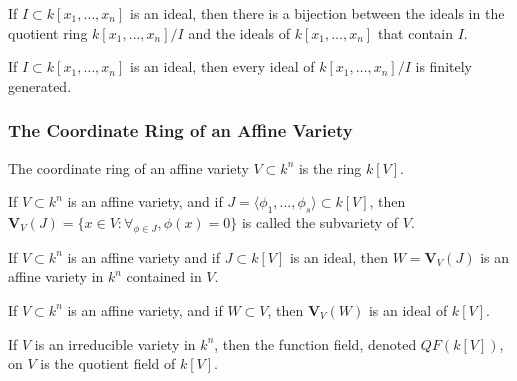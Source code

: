 \documentclass[crop=false,class=book,oneside]{standalone}
\begin{document}
                \begin{theorem}
                    If $I\subset k[x_1,\hdots ,x_n]$ is an ideal,
                    then there is a bijection between the ideals
                    in the quotient ring $k[x_1,\hdots ,x_n]/I$
                    and the ideals of $k[x_1,\hdots ,x_n]$
                    that contain $I$.
                \end{theorem}
                \begin{theorem}
                    If $I\subset k[x_1,\hdots ,x_n]$ is an ideal,
                    then every ideal of $k[x_1,\hdots ,x_n]/I$
                    is finitely generated.
                \end{theorem}
            \subsubsection{The Coordinate Ring of an Affine Variety}
                \begin{definition}
                    The coordinate ring of an affine variety
                    $V\subset k^n$ is the ring $k[V]$.
                \end{definition}
                \begin{definition}
                    If $V\subset k^n$ is an affine variety, and if
                    $J=\langle\phi_1,\hdots,\phi_s\rangle\subset k[V]$,
                    then
                    $\mathbf{V}_{V}(J)%
                     =\{x\in V:\forall_{\phi \in J},\phi(x)=0\}$
                    is called the subvariety of $V$.
                \end{definition}
                \begin{theorem}
                    If $V\subset k^n$ is an affine variety and if
                    $J\subset k[V]$ is an ideal, then
                    $W=\mathbf{V}_{V}(J)$ is an affine variety
                    in $k^n$ contained in $V$.
                \end{theorem}
                \begin{theorem}
                    If $V\subset k^n$ is an affine variety,
                    and if $W\subset V$, then $\mathbf{V}_{V}(W)$
                    is an ideal of $k[V]$.
                \end{theorem}
                \begin{definition}
                    If $V$ is an irreducible variety in $k^n$,
                    then the function field, denoted $QF(k[V])$,
                    on $V$ is the quotient field of $k[V]$.
                \end{definition}
\end{document}
